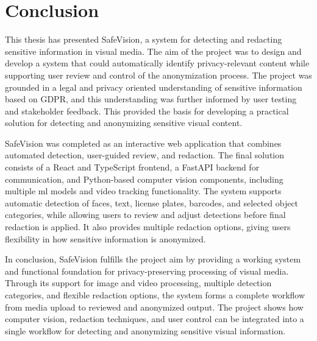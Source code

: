 \chapter{Conclusion}
\label{chap:conclusion}

This thesis has presented \gls{SafeVision}, a system for detecting and redacting sensitive information in visual media. The aim of the project was to design and develop a system that could automatically identify privacy-relevant content while supporting user review and control of the \gls{anonymization} process. The project was grounded in a legal and privacy oriented understanding of sensitive information based on GDPR, and this understanding was further informed by user testing and stakeholder feedback. This provided the basis for developing a practical solution for detecting and anonymizing sensitive visual content.

\gls{SafeVision} was completed as an interactive web application that combines automated detection, user-guided review, and redaction. The final solution consists of a React and TypeScript frontend, a FastAPI backend for communication, and Python-based computer vision components, including multiple \acrshort{ml} models and video tracking functionality. The system supports automatic detection of faces, text, license plates, barcodes, and selected object categories, while allowing users to review and adjust detections before final redaction is applied. It also provides multiple redaction options, giving users flexibility in how sensitive information is anonymized.

In conclusion, \gls{SafeVision} fulfills the project aim by providing a working system and functional foundation for privacy-preserving processing of visual media. Through its support for image and video processing, multiple detection categories, and flexible redaction options, the system forms a complete workflow from media upload to reviewed and anonymized output. The project shows how computer vision, redaction techniques, and user control can be integrated into a single workflow for detecting and anonymizing sensitive visual information.